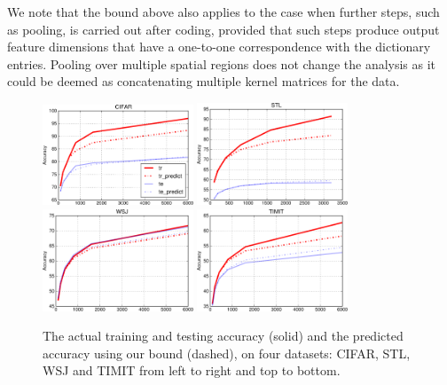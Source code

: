 We note that the bound above also applies to the case when further steps, such as pooling, is carried out after coding, provided that such steps produce output feature dimensions that have a one-to-one correspondence with the dictionary entries. Pooling over multiple spatial regions does not change the analysis as it could be deemed as concatenating multiple kernel matrices for the data.

\begin{figure}
    \centering
    \includegraphics[width=0.4\textwidth]{figs/sizematters/bound_CIFAR.pdf}
    \includegraphics[width=0.4\textwidth]{figs/sizematters/bound_STL.pdf}
    \includegraphics[width=0.4\textwidth]{figs/sizematters/bound_WSJ.pdf}
    \includegraphics[width=0.4\textwidth]{figs/sizematters/bound_TIMIT.pdf}
    \caption{The actual training and testing accuracy (solid) and the predicted accuracy using our bound (dashed), on four datasets: CIFAR, STL, WSJ and TIMIT from left to right and top to bottom.}\label{fig:bounds}
\end{figure}

